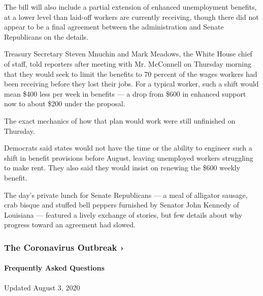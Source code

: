 The bill will also include a partial extension of enhanced unemployment
benefits, at a lower level than laid-off workers are currently
receiving, though there did not appear to be a final agreement between
the administration and Senate Republicans on the details.

Treasury Secretary Steven Mnuchin and Mark Meadows, the White House
chief of staff, told reporters after meeting with Mr. McConnell on
Thursday morning that they would seek to limit the benefits to 70
percent of the wages workers had been receiving before they lost their
jobs. For a typical worker, such a shift would mean \$400 less per week
in benefits --- a drop from \$600 in enhanced support now to about \$200
under the proposal.

The exact mechanics of how that plan would work were still unfinished on
Thursday.

Democrats said states would not have the time or the ability to engineer
such a shift in benefit provisions before August, leaving unemployed
workers struggling to make rent. They also said they would insist on
renewing the \$600 weekly benefit.

The day's private lunch for Senate Republicans --- a meal of alligator
sausage, crab bisque and stuffed bell peppers furnished by Senator John
Kennedy of Louisiana --- featured a lively exchange of stories, but few
details about why progress toward an agreement had slowed.

\href{https://www.nytimes3xbfgragh.onion/news-event/coronavirus?action=click\&pgtype=Article\&state=default\&region=MAIN_CONTENT_3\&context=storylines_faq}{}

\hypertarget{the-coronavirus-outbreak-}{%
\subsubsection{The Coronavirus Outbreak
›}\label{the-coronavirus-outbreak-}}

\hypertarget{frequently-asked-questions}{%
\paragraph{Frequently Asked
Questions}\label{frequently-asked-questions}}

Updated August 3, 2020

